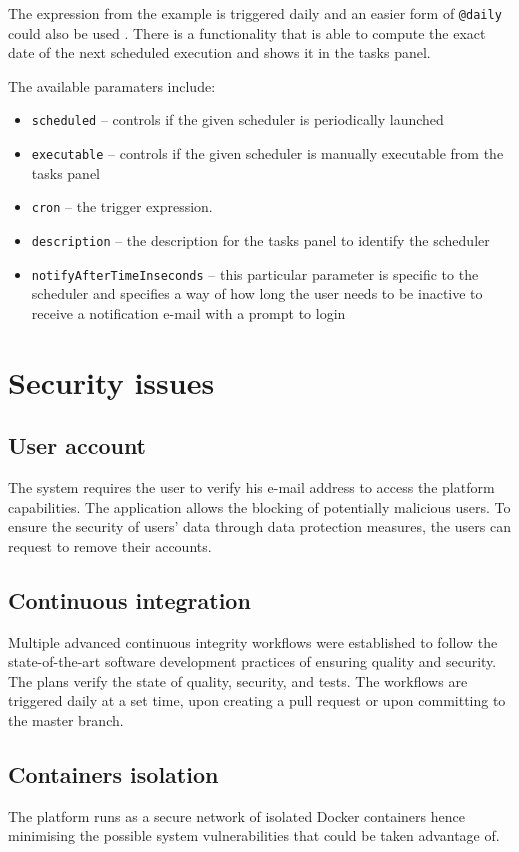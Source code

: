 \documentclass[a4paper,twoside,12pt]{book}
\begin{document}
The expression from the example is triggered daily and an easier form of \verb|@daily| could also be used \cite{bib:spring_cron}. There is a functionality that is able to compute the exact date of the next scheduled execution and shows it in the tasks panel.

The available paramaters include:
\begin{itemize}
\item \verb|scheduled| -- controls if the given scheduler is periodically launched
\item \verb|executable| -- controls if the given scheduler is manually executable from the tasks panel
\item \verb|cron| -- the trigger expression. 
\item \verb|description| -- the description for the tasks panel to identify the scheduler
\item \verb|notifyAfterTimeInseconds| -- this particular parameter is specific to the scheduler and specifies a way of how long the user needs to be inactive to receive a notification e-mail with a prompt to login
\end{itemize}

\section{Security issues}

\subsection{User account}
The system requires the user to verify his e-mail address to access the platform capabilities. The application allows the blocking of potentially malicious users. To ensure the security of users' data through data protection measures, the users can request to remove their accounts.

\subsection{Continuous integration}
Multiple advanced continuous integrity workflows were established to follow the state-of-the-art software development practices of ensuring quality and security. The plans verify the state of quality, security, and tests. The workflows are triggered daily at a set time, upon creating a pull request or upon committing to the master branch.

\subsection{Containers isolation}
The platform runs as a secure network of isolated Docker containers hence minimising the possible system vulnerabilities that could be taken advantage of.
\end{document}
